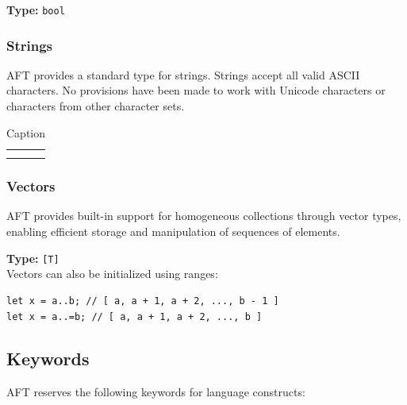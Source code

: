 \textbf{Type:} \texttt{bool}

\subsubsection{Strings}
AFT provides a standard type for strings. Strings accept all valid ASCII characters. No provisions have been made to work with Unicode characters or characters from other character sets.
\begin{table}[]
    \centering
    \begin{tabular}{c|c}
         &  \\
         & 
    \end{tabular}
    \caption{Caption}
    \label{tab:placeholder}
\end{table}

\subsubsection{Vectors}
AFT provides built-in support for homogeneous collections through vector types, enabling efficient storage and manipulation of sequences of elements.

\textbf{Type:} \texttt{[T]} \\
Vectors can also be initialized using ranges:
\begin{verbatim}
let x = a..b; // [ a, a + 1, a + 2, ..., b - 1 ]
let x = a..=b; // [ a, a + 1, a + 2, ..., b ]
\end{verbatim}
\subsection{Keywords}
AFT reserves the following keywords for language constructs:

